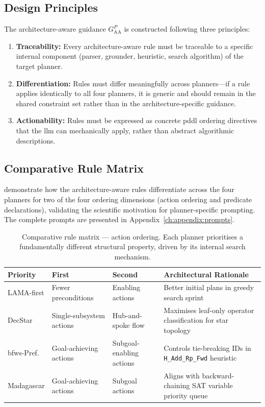 \subsection{Design Principles}

The architecture-aware guidance $G_\text{AA}^{P}$ is constructed following three principles:

\begin{enumerate}
  \item \textbf{Traceability:} Every architecture-aware rule must be traceable to a specific internal component (parser, grounder, heuristic, search algorithm) of the target planner.
  \item \textbf{Differentiation:} Rules must differ meaningfully across planners---if a rule applies identically to all four planners, it is generic and should remain in the shared constraint set rather than in the architecture-specific guidance.
  \item \textbf{Actionability:} Rules must be expressed as concrete \gls{pddl} ordering directives that the \gls{llm} can mechanically apply, rather than abstract algorithmic descriptions.
\end{enumerate}

\subsection{Comparative Rule Matrix}

 demonstrate how the architecture-aware rules differentiate across the four planners for two of the four ordering dimensions (action ordering and predicate declarations), validating the scientific motivation for planner-specific prompting.
The complete prompts are presented in Appendix~\ref{ch:appendix:prompts}.

\begin{table}[htbp]
  \centering
  \caption{Comparative rule matrix --- action ordering. Each planner prioritises a fundamentally different structural property, driven by its internal search mechanism.}
  \label{tab:rule_matrix_actions}
  \small
  \begin{tabular}{p{2.5cm} p{3cm} p{3cm} p{4.5cm}}
    \toprule
    \textbf{Priority} & \textbf{First} & \textbf{Second} & \textbf{Architectural Rationale} \\
    \midrule
    LAMA-first & Fewer preconditions & Enabling actions & Better initial plans in greedy search sprint \\
    \addlinespace
    DecStar & Single-subsystem actions & Hub-and-spoke flow & Maximises leaf-only operator classification for star topology \\
    \addlinespace
    \gls{bfws}-Pref. & Goal-achieving actions & Subgoal-enabling actions & Controls tie-breaking IDs in \texttt{H\_Add\_Rp\_Fwd} heuristic \\
    \addlinespace
    Madagascar & Goal-achieving actions & Subgoal actions & Aligns with backward-chaining SAT variable priority queue \\
    \bottomrule
  \end{tabular}
\end{table}

